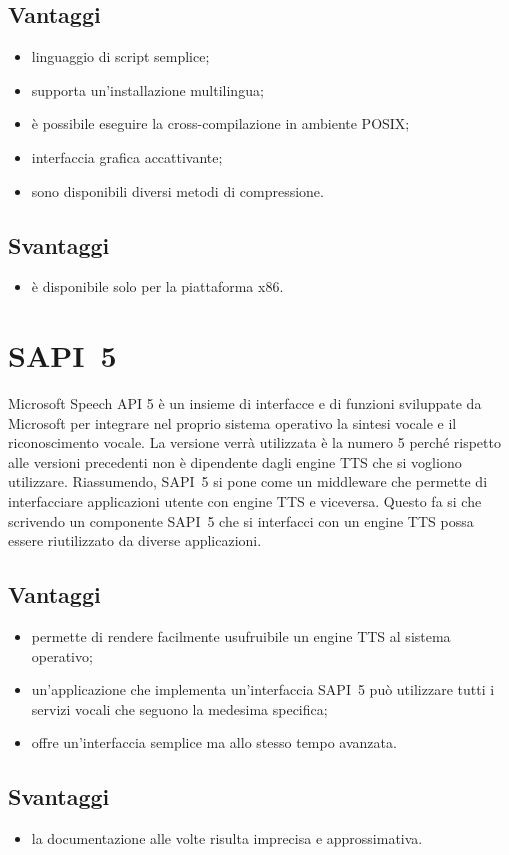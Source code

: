 \subsection*{Vantaggi}
\begin{itemize}
	\item linguaggio di script semplice;
	\item supporta un'installazione multilingua;
	\item è possibile eseguire la cross-compilazione in ambiente POSIX;
	\item interfaccia grafica accattivante;
	\item sono disponibili diversi metodi di compressione.
\end{itemize}
\subsection*{Svantaggi}
\begin{itemize}
	\item è disponibile solo per la piattaforma x86.
\end{itemize}
\section{SAPI~5}
Microsoft Speech API 5 è un insieme di interfacce e di funzioni sviluppate da Microsoft per integrare nel proprio sistema operativo la sintesi vocale e il riconoscimento vocale. La versione verrà utilizzata è la numero 5 perché rispetto alle versioni precedenti non è dipendente dagli engine TTS che si vogliono utilizzare. Riassumendo, SAPI~5 si pone come un middleware che permette di interfacciare applicazioni utente con engine TTS e viceversa. Questo fa si che scrivendo un componente SAPI~5 che si interfacci con un engine TTS possa essere riutilizzato da diverse applicazioni.
\subsection*{Vantaggi}
\begin{itemize}
	\item permette di rendere facilmente usufruibile un engine TTS al sistema operativo;
	\item un'applicazione che implementa un'interfaccia SAPI~5 può utilizzare tutti i servizi vocali che seguono la medesima specifica;
	\item offre un'interfaccia semplice ma allo stesso tempo avanzata.
\end{itemize}
\subsection*{Svantaggi}
\begin{itemize}
	\item la documentazione alle volte risulta imprecisa e approssimativa.
\end{itemize}
